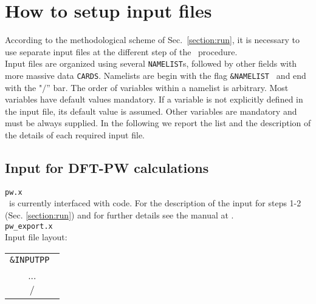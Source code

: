 
\thispagestyle{empty}
\section{How to setup input files}\label{sec:input}

\noindent According to the methodological scheme of Sec.~\ref{section:run}, 
it is necessary to use separate input files at
the different step of the \WANT\ procedure.\\

\noindent Input files are organized using several {\tt NAMELIST}s,
followed by other fields with more massive data {\tt CARDS}. Namelists are
begin with the flag {\tt \&NAMELIST } and end with the
"$/$'' bar. The order of variables within a namelist is
arbitrary. Most variables have default values mandatory. 
If a variable is not explicitly defined in the input file, 
its default value is assumed. Other variables are mandatory and must be
always supplied.
In the following we report the list and the description
of the details of each required input file.

\subsection{Input for DFT-PW calculations}
 {\tt pw.x}
\\
\noindent \WANT\ is currently interfaced with \PWSCF code. For the
description of the input for steps 1-2 (Sec. \ref{section:run})
and for further details see the \PWSCF manual at \PWSCFURL .\\

  {\tt pw\_export.x}
\\
\noindent Input file layout: \\

%
%
\begin{tabular}{c}
  {\tt \&INPUTPP } \\
    ... \\
  $/$
\end{tabular}
%
%
\\

